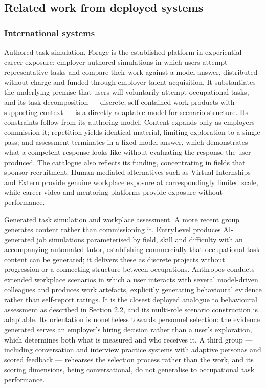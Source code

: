 \subsection{Related work from deployed systems}

\subsubsection{International systems}

Authored task simulation. Forage\cite{r83} is the established platform in experiential career exposure: employer-\allowbreak{}authored simulations in which users attempt representative tasks and compare their work against a model answer, distributed without charge and funded through employer talent acquisition. It substantiates the underlying premise that users will voluntarily attempt occupational tasks, and its task decomposition --- discrete, self-\allowbreak{}contained work products with supporting context --- is a directly adaptable model for scenario structure. Its constraints follow from its authoring model. Content expands only as employers commission it; repetition yields identical material, limiting exploration to a single pass; and assessment terminates in a fixed model answer, which demonstrates what a competent response looks like without evaluating the response the user produced. The catalogue also reflects its funding, concentrating in fields that sponsor recruitment. Human-\allowbreak{}mediated alternatives such as Virtual Internships and Extern provide genuine workplace exposure at correspondingly limited scale, while career video and mentoring platforms provide exposure without performance.

Generated task simulation and workplace assessment. A more recent group generates content rather than commissioning it. EntryLevel\cite{r84} produces AI-\allowbreak{}generated job simulations parameterised by field, skill and difficulty with an accompanying automated tutor, establishing commercially that occupational task content can be generated; it delivers these as discrete projects without progression or a connecting structure between occupations. Anthropos\cite{r85} conducts extended workplace scenarios in which a user interacts with several model-\allowbreak{}driven colleagues and produces work artefacts, explicitly generating behavioural evidence rather than self-report ratings. It is the closest deployed analogue to behavioural assessment as described in Section 2.2, and its multi-role scenario construction is adaptable. Its orientation is nonetheless towards personnel selection: the evidence generated serves an employer's hiring decision rather than a user's exploration, which determines both what is measured and who receives it. A third group --- including conversation and interview practice systems with adaptive personas and scored feedback\cite{r86} --- rehearses the selection process rather than the work, and its scoring dimensions, being conversational, do not generalise to occupational task performance.

